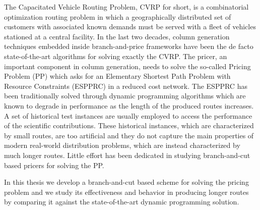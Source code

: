 \noindent The Capacitated Vehicle Routing Problem, CVRP for short,
is a combinatorial optimization routing problem in which
a geographically distributed set of
customers with associated known demands must be served with a fleet of vehicles
stationed at a central facility.
In the last two decades,
column generation techniques embedded inside branch-and-price frameworks
have been the de facto state-of-the-art algorithms
for solving exactly the CVRP.
The pricer, an important component in column generation, needs to solve
the so-called Pricing Problem (PP) which asks for an
Elementary Shortest Path Problem with Resource Constraints (ESPPRC)
in a reduced cost network.
The ESPPRC has been traditionally solved through dynamic programming
algorithms which are known to degrade in performance as
the length of the produced routes increases.
A set of historical test instances are usually employed to access
the performance of the scientific contributions.
These historical instances,
which are characterized by small routes,
are too artificial
and they do not capture the main properties of modern real-world distribution
problems,
which are instead characterized by much longer routes.
Little effort has been dedicated in studying branch-and-cut
based pricers for solving the PP.

\noindent In this thesis we develop
a branch-and-cut based scheme for solving the pricing problem
and we study its effectiveness and behavior in producing longer routes
by comparing it against the state-of-the-art dynamic programming solution.
